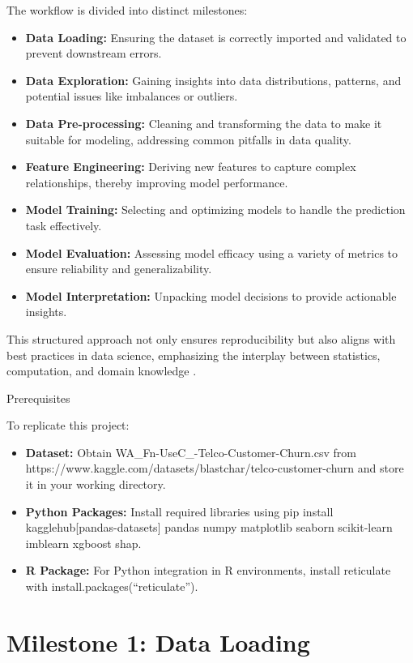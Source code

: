 \documentclass[preprint, 3p,
authoryear]{elsarticle} %
\begin{document}
The workflow is divided into distinct milestones:

\begin{itemize}
\item
  \textbf{Data Loading:} Ensuring the dataset is correctly imported and
  validated to prevent downstream errors.
\item
  \textbf{Data Exploration:} Gaining insights into data distributions,
  patterns, and potential issues like imbalances or outliers.
\item
  \textbf{Data Pre-processing:} Cleaning and transforming the data to
  make it suitable for modeling, addressing common pitfalls in data
  quality.
\item
  \textbf{Feature Engineering:} Deriving new features to capture complex
  relationships, thereby improving model performance.
\item
  \textbf{Model Training:} Selecting and optimizing models to handle the
  prediction task effectively.
\item
  \textbf{Model Evaluation:} Assessing model efficacy using a variety of
  metrics to ensure reliability and generalizability.
\item
  \textbf{Model Interpretation:} Unpacking model decisions to provide
  actionable insights.
\end{itemize}

This structured approach not only ensures reproducibility but also
aligns with best practices in data science, emphasizing the interplay
between statistics, computation, and domain knowledge
\citep{hanaexploring}.

Prerequisites

To replicate this project:

\begin{itemize}
\item
  \textbf{Dataset:} Obtain WA\_Fn-UseC\_-Telco-Customer-Churn.csv from
  https://www.kaggle.com/datasets/blastchar/telco-customer-churn and
  store it in your working directory.
\item
  \textbf{Python Packages:} Install required libraries using pip install
  kagglehub{[}pandas-datasets{]} pandas numpy matplotlib seaborn
  scikit-learn imblearn xgboost shap.
\item
  \textbf{R Package:} For Python integration in R environments, install
  reticulate with install.packages(``reticulate'').
\end{itemize}

\section{Milestone 1: Data Loading}\label{milestone-1-data-loading}
\end{document}
